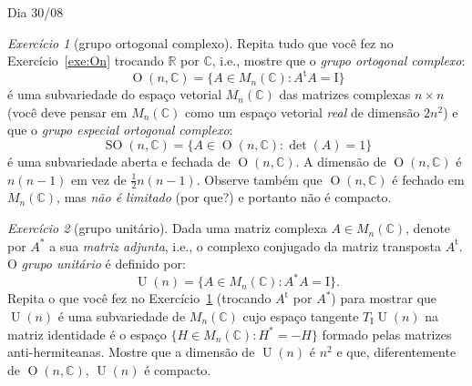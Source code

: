 \documentclass[oneside,11pt]{amsart}
\newcommand{\R}{\mathds R}
\newcommand{\C}{\mathds C}
\newcommand{\I}{\mathrm I}
\newcommand{\transp}{\mathrm t}
\DeclareMathOperator{\Or}{O}
\DeclareMathOperator{\SO}{SO}
\DeclareMathOperator{\Ur}{U}
\theoremstyle{remark}\newtheorem{exercise}{Exercício}[section]
\theoremstyle{plain}\newtheorem{teo}{Teorema}[section]
\theoremstyle{plain}\newtheorem{lem}[teo]{Lema}
\theoremstyle{plain}\newtheorem{prop}[teo]{Proposição}
\theoremstyle{definition}\newtheorem{defin}[teo]{Definição}
\theoremstyle{remark}\newtheorem{rem}[teo]{Observação}
\theoremstyle{definition}\newtheorem{example}[teo]{Exemplo}
\numberwithin{equation}{section}
\begin{document}
\begin{section}{Dia 30/08}
\begin{exercise}[grupo ortogonal complexo]\label{exe:OnC}
Repita tudo que você fez no Exercício~\ref{exe:On} trocando $\R$ por $\C$, i.e., mostre que o {\em grupo ortogonal complexo}:
\[\Or(n,\C)=\big\{A\in M_n(\C):A^\transp A=\I\big\}\]
é uma subvariedade do espaço vetorial $M_n(\C)$ das matrizes complexas $n\times n$ (você deve pensar em $M_n(\C)$ como um espaço vetorial {\em real\/} de dimensão
$2n^2$) e que o {\em grupo especial ortogonal complexo}:
\[\SO(n,\C)=\big\{A\in\Or(n,\C):\det(A)=1\big\}\]
é uma subvariedade aberta e fechada de $\Or(n,\C)$. A dimensão de $\Or(n,\C)$ é $n(n-1)$ em vez de $\frac12n(n-1)$. Observe também que $\Or(n,\C)$
é fechado em $M_n(\C)$, mas {\em não é limitado\/} (por que?) e portanto não é compacto.
\end{exercise}

\begin{exercise}[grupo unitário]
Dada uma matriz complexa $A\in M_n(\C)$, denote por $A^*$ a sua {\em matriz adjunta}, i.e., o complexo conjugado da matriz transposta $A^\transp$.
O {\em grupo unitário\/} é definido por:
\[\Ur(n)=\big\{A\in M_n(\C):A^*A=\I\big\}.\]
Repita o que você fez no Exercício~\ref{exe:OnC} (trocando $A^\transp$ por $A^*$) para mostrar que $\Ur(n)$ é uma subvariedade de $M_n(\C)$ cujo
espaço tangente $T_\I\!\Ur(n)$ na matriz identidade é o espaço $\big\{H\in M_n(\C):H^*=-H\big\}$ formado pelas matrizes anti-hermiteanas. Mostre que a dimensão
de $\Ur(n)$ é $n^2$ e que, diferentemente de $\Or(n,\C)$, $\Ur(n)$ é compacto.
\end{exercise}


\end{section}
\end{document}
